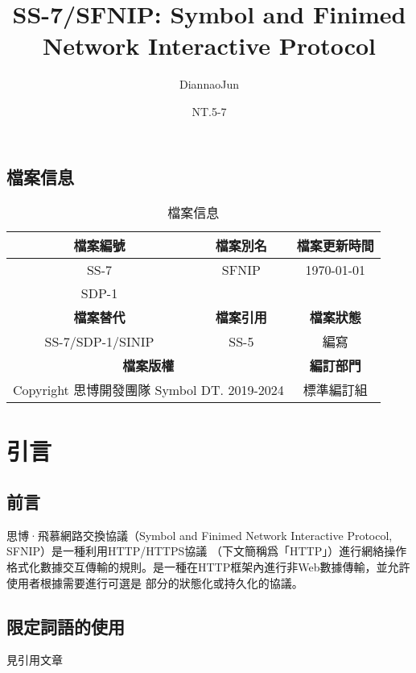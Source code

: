 \documentclass[16pt, a4paper]{article}
\begin{document}
	\title{SS-7/SFNIP: Symbol and Finimed Network Interactive Protocol}
	\author{DiannaoJun}
	\date{NT.5-7}
	\maketitle              %
	\tableofcontents
		\subsection{檔案信息}
			\begin{table}[ht]\centering
				\begin{tabular}{|c|c|c|}
    				\hline
    					\textbf{檔案編號} & \textbf{檔案別名} & \textbf{檔案更新時間 }\\
					\hline
						SS-7 & SFNIP & \today{} \\
    					SDP-1 & ~ & ~ \\
    				\hline
    				\hline
    					\textbf{檔案替代} & \textbf{檔案引用} & \textbf{檔案狀態} \\
    				\hline
    					SS-7/SDP-1/SINIP & SS-5 & 編寫 \\
    				\hline
    				\hline
    					\multicolumn{2}{|c|}{\textbf{檔案版權}} & \textbf{編訂部門}\\
    				\hline
    					\multicolumn{2}{|c|}{Copyright \textcopyright{} 思博開發團隊 Symbol DT. 2019-2024} & 標準編訂組 \\
    				\hline
    			\end{tabular}
    		\caption{檔案信息}\label{tab:multicolumn}\end{table}
	\section{引言}
		\subsection{前言}
			思博·飛慕網路交換協議（Symbol and Finimed Network Interactive Protocol, SFNIP）是一種利用HTTP/HTTPS協議
			（下文簡稱爲「HTTP」）進行網絡操作格式化數據交互傳輸的規則。是一種在HTTP框架內進行非Web數據傳輸，並允許使用者根據需要進行可選是
			部分的狀態化或持久化的協議。
		\subsection{限定詞語的使用}
			見引用文章
\end{document}
